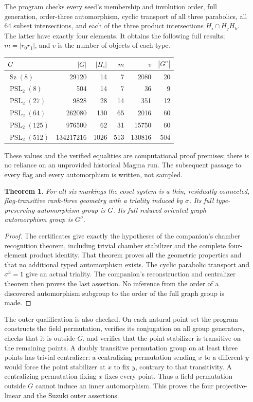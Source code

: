 \documentclass[11pt,a4paper]{article}
\newtheorem{theorem}{Theorem}\newtheorem{proposition}[theorem]{Proposition}
\begin{document}
The program checks every seed's membership and involution order, full
generation, order-three automorphism, cyclic transport of all three
parabolics, all 64 subset intersections, and each of the three product
intersections $H_i\cap H_jH_k$. The latter have exactly four elements.
It obtains the following full results; $m=|r_0r_1|$, and $v$ is the number
of objects of each type.
\begin{center}
\begin{tabular}{lrrrrr}
\toprule
$G$&$|G|$&$|H_i|$&$m$&$v$&$|G^\sigma|$\\\midrule
$\operatorname{Sz}(8)$&29120&14&7&2080&20\\
$\operatorname{PSL}_2(8)$&504&14&7&36&9\\
$\operatorname{PSL}_2(27)$&9828&28&14&351&12\\
$\operatorname{PSL}_2(64)$&262080&130&65&2016&60\\
$\operatorname{PSL}_2(125)$&976500&62&31&15750&60\\
$\operatorname{PSL}_2(512)$&134217216&1026&513&130816&504\\\bottomrule
\end{tabular}
\end{center}
These values and the verified equalities are computational proof premises;
there is no reliance on an unprovided historical Magma run. The subsequent
passage to every flag and every automorphism is written, not sampled.

\begin{theorem}\label{examples}
For all six markings the coset system is a thin, residually connected,
flag-transitive rank-three geometry with a triality induced by $\sigma$.
Its full type-preserving automorphism group is $G$. Its full reduced oriented
graph automorphism group is $G^\sigma$.
\end{theorem}
\begin{proof}
The certificates give exactly the hypotheses of the companion's chamber
recognition theorem, including trivial chamber stabilizer and the complete
four-element product identity. That theorem proves all the geometric
properties and that no additional typed automorphism exists. The cyclic
parabolic transport and $\sigma^3=1$ give an actual triality. The companion's
reconstruction and centralizer theorem then proves the last assertion.
No inference from the order of a discovered automorphism subgroup to the
order of the full graph group is made.
\end{proof}

The outer qualification is also checked. On each natural point set the
program constructs the field permutation, verifies its conjugation on all
group generators, checks that it is outside $G$, and verifies that the
point stabilizer is transitive on the remaining points. A doubly transitive
permutation group on at least three points has trivial centralizer: a
centralizing permutation sending $x$ to a different $y$ would force the
point stabilizer at $x$ to fix $y$, contrary to that transitivity. A
centralizing permutation fixing $x$ fixes every point. Thus a field
permutation outside $G$ cannot induce an inner automorphism. This proves
the four projective-linear and the Suzuki outer assertions.
\end{document}
